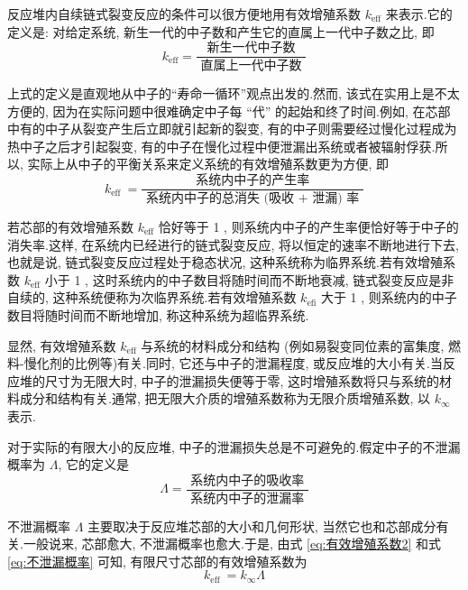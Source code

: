 \documentclass{Sichuan Normal University}
\begin{document}
反应堆内自续链式裂变反应的条件可以很方便地用有效增殖系数 $k_{\mathrm{eff}}$ 来表示.它的定义是: 对给定系统, 新生一代的中子数和产生它的直属上一代中子数之比, 即
\begin{equation}
    k_{\mathrm{eff}}=\frac{\text { 新生一代中子数 }}{\text { 直属上一代中子数 }}
    \label{eq:有效增殖系数}
\end{equation}

上式的定义是直观地从中子的“寿命一循环”观点出发的.然而, 该式在实用上是不太方便的, 因为在实际问题中很难确定中子每 “代” 的起始和终了时间.例如, 在芯部中有的中子从裂变产生后立即就引起新的裂变, 有的中子则需要经过慢化过程成为热中子之后才引起裂变, 有的中子在慢化过程中便泄漏出系统或者被辐射俘获.所以, 实际上从中子的平衡关系来定义系统的有效增殖系数更为方便, 即
\begin{equation}
    k_{\text {eff }}=\frac{\text { 系统内中子的产生率 }}{\text { 系统内中子的总消失 (吸收 }+ \text { 泄漏) 率 }}
    \label{eq:有效增殖系数2}
\end{equation}

若芯部的有效增殖系数 $k_{\mathrm{eff}}$ 恰好等于 1 , 则系统内中子的产生率便恰好等于中子的消失率.这样, 在系统内已经进行的链式裂变反应, 将以恒定的速率不断地进行下去, 也就是说, 链式裂变反应过程处于稳态状况, 这种系统称为临界系统.若有效增殖系数 $k_{\mathrm{eff}}$ 小于 1 , 这时系统内的中子数目将随时间而不断地衰减, 链式裂变反应是非自续的, 这种系统便称为次临界系统.若有效增殖系数 $k_{\mathrm{efi}}$ 大于 1 , 则系统内的中子数目将随时间而不断地增加, 称这种系统为超临界系统.

显然, 有效增殖系数 $k_{\mathrm{eff}}$ 与系统的材料成分和结构 (例如易裂变同位素的富集度, 燃料-慢化剂的比例等)有关.同时, 它还与中子的泄漏程度, 或反应堆的大小有关.当反应堆的尺寸为无限大时, 中子的泄漏损失便等于零, 这时增殖系数将只与系统的材料成分和结构有关.通常, 把无限大介质的增殖系数称为无限介质增殖系数, 以 $k_{\infty}$ 表示.

对于实际的有限大小的反应堆, 中子的泄漏损失总是不可避免的.假定中子的不泄漏概率为 $\Lambda$, 它的定义是
\begin{equation}
    \Lambda=\frac{\text { 系统内中子的吸收率 }}{\text { 系统内中子的泄漏率 }}
    \label{eq:不泄漏概率}
\end{equation}

不泄漏概率 $\Lambda$ 主要取决于反应堆芯部的大小和几何形状, 当然它也和芯部成分有关.一般说来, 芯部愈大, 不泄漏概率也愈大.于是, 由式 \eqref{eq:有效增殖系数2} 和式 \eqref{eq:不泄漏概率} 可知, 有限尺寸芯部的有效增殖系数为
\begin{equation}
    k_{\text {eff }}=k_{\infty} \Lambda
    \label{eq:有效增殖系数3}
\end{equation}
\end{document}
